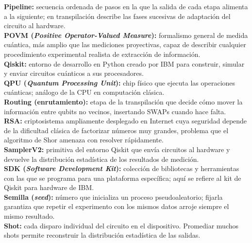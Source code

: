 \documentclass[12pt, spanish]{book}
\begin{document}
\textbf{Pipeline:} secuencia ordenada de pasos en la que la salida de cada etapa alimenta a la siguiente; en transpilación describe las fases sucesivas de adaptación del circuito al hardware.\\

\textbf{POVM (\textit{Positive Operator-Valued Measure}):} formalismo general de medida cuántica, más amplio que las mediciones proyectivas, capaz de describir cualquier procedimiento experimental realista de extracción de información.\\

\textbf{Qiskit:} entorno de desarrollo en Python creado por IBM para construir, simular y enviar circuitos cuánticos a sus procesadores.\\

\textbf{QPU (\textit{Quantum Processing Unit}):} chip físico que ejecuta las operaciones cuánticas; análogo de la CPU en computación clásica.\\

\textbf{Routing (enrutamiento):} etapa de la transpilación que decide cómo mover la información entre qubits no vecinos, insertando SWAPs cuando hace falta.\\

\textbf{RSA:} criptosistema ampliamente desplegado en Internet cuya seguridad depende de la dificultad clásica de factorizar números muy grandes, problema que el algoritmo de Shor amenaza con resolver rápidamente.\\

\textbf{SamplerV2:} primitiva del entorno Qiskit que envía circuitos al hardware y devuelve la distribución estadística de los resultados de medición.\\

\textbf{SDK (\textit{Software Development Kit}):} colección de bibliotecas y herramientas con las que se programa para una plataforma específica; aquí se refiere al kit de Qiskit para hardware de IBM.\\

\textbf{Semilla (\textit{seed}):} número que inicializa un proceso pseudoaleatorio; fijarla garantiza que repetir el experimento con los mismos datos arroje siempre el mismo resultado.\\

\textbf{Shot:} cada disparo individual del circuito en el dispositivo. Promediar muchos shots permite reconstruir la distribución estadística de las salidas.\\
\end{document}
